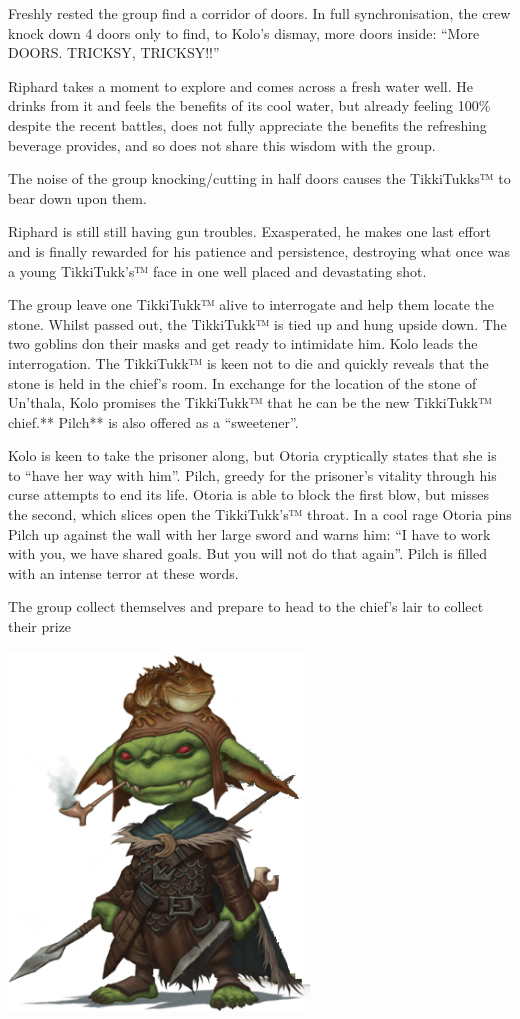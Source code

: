 Freshly rested the group find a corridor of doors. In full synchronisation, the crew knock down 4 doors only to find, to Kolo’s dismay, more doors inside: “More DOORS. TRICKSY, TRICKSY!!”\medskip

Riphard takes a moment to explore and comes across a fresh water well. He drinks from it and feels the benefits of its cool water, but already feeling 100\% despite the recent battles, does not fully appreciate the benefits the refreshing beverage provides, and so does not share this wisdom with the group.\medskip

The noise of the group knocking/cutting in half doors causes the TikkiTukks™ to bear down upon them.\medskip

Riphard is still still having gun troubles. Exasperated, he makes one last effort and is finally rewarded for his patience and persistence, destroying what once was a young TikkiTukk's™ face in one well placed and devastating shot.\medskip

The group leave one TikkiTukk™ alive to interrogate and help them locate the stone. Whilst passed out, the TikkiTukk™ is tied up and hung upside down. The two goblins don their masks and get ready to intimidate him. Kolo leads the interrogation. The TikkiTukk™ is keen not to die and quickly reveals that the stone is held in the chief’s room. In exchange for the location of the stone of Un'thala, Kolo promises the TikkiTukk™ that he can be the new TikkiTukk™ chief.** Pilch** is also offered as a “sweetener”.\medskip

Kolo is keen to take the prisoner along, but Otoria cryptically states that she is to “have her way with him”. Pilch, greedy for the prisoner’s vitality through his curse attempts to end its life. Otoria is able to block the first blow, but misses the second, which slices open the TikkiTukk’s™ throat. In a cool rage Otoria pins Pilch up against the wall with her large sword and warns him: “I have to work with you, we have shared goals. But you will not do that again”. Pilch is filled with an intense terror at these words.\medskip

The group collect themselves and prepare to head to the chief’s lair to collect their prize

\begin{center}
\includegraphics[width=80mm]{./content/img/kolo2.png}
\begin{figure}[h]
\end{figure}
\end{center}